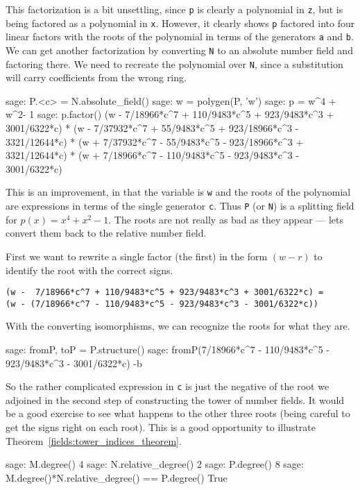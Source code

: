 %
This factorization is a bit unsettling, since \verb?p? is clearly a polynomial in \verb?z?, but is being factored as a polynomial in \verb?x?.  However, it clearly shows \verb?p? factored into four linear factors with the roots of the polynomial in terms of the generators \verb?a? and \verb?b?.  We can get another factorization by converting \verb?N? to an absolute number field and factoring there.  We need to recreate the polynomial over \verb?N?, since a substitution will carry coefficients from the wrong ring.
%
\begin{sageexample}
sage: P.<c> = N.absolute_field()
sage: w = polygen(P, 'w')
sage: p = w^4 + w^2- 1
sage: p.factor()
(w - 7/18966*c^7 + 110/9483*c^5 +  923/9483*c^3 +  3001/6322*c) *
(w - 7/37932*c^7 +  55/9483*c^5 + 923/18966*c^3 - 3321/12644*c) *
(w + 7/37932*c^7 -  55/9483*c^5 - 923/18966*c^3 + 3321/12644*c) *
(w + 7/18966*c^7 - 110/9483*c^5 -  923/9483*c^3 -  3001/6322*c)
\end{sageexample}
%
This is an improvement, in that the variable is \verb?w? and the roots of the polynomial are expressions in terms of the single generator \verb?c?.  Thus \verb?P? (or \verb?N?) is a splitting field for $p(x)=x^4+x^2-1$.  The roots are not really as bad as they appear --- lets convert them back to the relative number field.\par
%
First we want to rewrite a single factor (the first) in the form $(w-r)$ to identify the root with the correct signs.\par\noindent
\verb?(w -  7/18966*c^7 + 110/9483*c^5 + 923/9483*c^3 + 3001/6322*c) =?\\
\verb?(w - (7/18966*c^7 - 110/9483*c^5 - 923/9483*c^3 - 3001/6322*c))?\par
%
With the converting isomorphisms, we can recognize the roots for what they are.
%
\begin{sageexample}
sage: fromP, toP = P.structure()
sage: fromP(7/18966*c^7 - 110/9483*c^5 - 923/9483*c^3 - 3001/6322*c)
-b
\end{sageexample}
%
So the rather complicated expression in \verb?c? is just the negative of the root we adjoined in the second step of constructing the tower of number fields.  It would be a good exercise to see what happens to the other three roots (being careful to get the signs right on each root).  This is a good opportunity to illustrate Theorem~\ref{fields:tower_indices_theorem}.
%
\begin{sageexample}
sage: M.degree()
4
sage: N.relative_degree()
2
sage: P.degree()
8
sage: M.degree()*N.relative_degree() == P.degree()
True
\end{sageexample}
